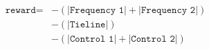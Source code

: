 \documentclass{standalone}
\begin{document}
\begin{minipage}{8cm}
\begin{equation*}
	\begin{split}
		\texttt{reward} = 	&- (|\texttt{Frequency 1}| + |\texttt{Frequency 2}|) \\
			  				&- (|\texttt{Tieline}|) \\
			  				&- (|\texttt{Control 1}| + |\texttt{Control 2}|)
	\end{split}
\end{equation*}
\end{minipage}
\end{document}

